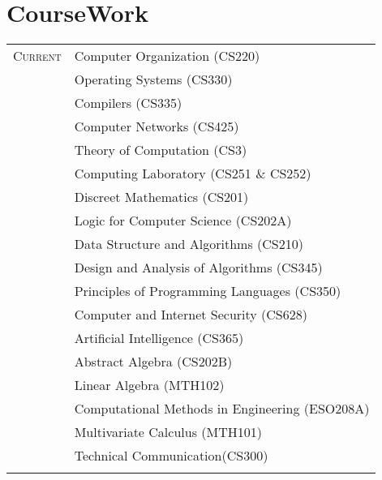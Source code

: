 \documentclass[a4paper,10pt]{article} %
\begin{document}
\section{CourseWork}

\begin{tabular}{rl}

    \textsc{Current} & Computer Organization (CS220) \\
                     & Operating Systems (CS330) \\
                     & Compilers (CS335) \\
                     & Computer Networks (CS425) \\
                     & Theory of Computation (CS3) \\
                     & Computing Laboratory (CS251 \& CS252)\\
                     & Discreet Mathematics (CS201)\\
                     & Logic for Computer Science (CS202A)\\
                     & Data Structure and Algorithms (CS210)\\
                     & Design and Analysis of Algorithms (CS345)\\
                     & Principles of Programming Languages (CS350)\\
                     & Computer and Internet Security (CS628)\\
                     & Artificial Intelligence (CS365)\\
                     & Abstract Algebra (CS202B)\\
                     & Linear Algebra (MTH102)\\
                     & Computational Methods in Engineering (ESO208A)\\
                     & Multivariate Calculus (MTH101)\\
                     & Technical Communication(CS300)\\
                     \\
\end{tabular}
\end{document}
